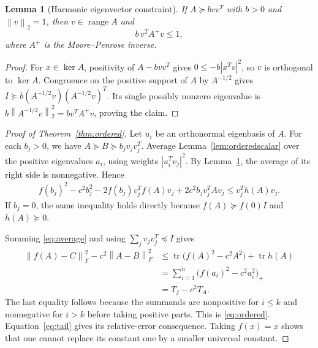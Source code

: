 \documentclass[11pt]{article}
\newtheorem{lemma}[theorem]{Lemma}
\theoremstyle{definition}
\newcommand{\tr}{\operatorname{tr}}
\newcommand{\range}{\operatorname{range}}
\newcommand{\norm}[1]{\left\lVert#1\right\rVert}
\newcommand{\TA}{T_A}
\newcommand{\Tf}{T_f}
\begin{document}
\begin{lemma}[Harmonic eigenvector constraint]\label{lem:harmonic}
If $A\succeq bvv^T$ with $b>0$ and $\norm v_2=1$, then $v\in\range A$ and
\[
 b\,v^TA^+v\le1,
\]
where $A^+$ is the Moore--Penrose inverse.
\end{lemma}
\begin{proof}
For $x\in\ker A$, positivity of $A-bvv^T$ gives $0\le-b|x^Tv|^2$, so $v$ is orthogonal to $\ker A$. Congruence on the positive support of $A$ by $A^{-1/2}$ gives $I\succeq b(A^{-1/2}v)(A^{-1/2}v)^T$. Its single possibly nonzero eigenvalue is $b\norm{A^{-1/2}v}_2^2=bv^TA^+v$, proving the claim.
\end{proof}

\begin{proof}[Proof of Theorem~\ref{thm:ordered}]
Let $u_i$ be an orthonormal eigenbasis of $A$. For each $b_j>0$, we have $A\succeq B\succeq b_jv_jv_j^T$. Average Lemma~\ref{lem:orderedscalar} over the positive eigenvalues $a_i$, using weights $|u_i^Tv_j|^2$. By Lemma~\ref{lem:harmonic}, the average of its right side is nonnegative. Hence
\begin{align}\label{eq:average}
 f(b_j)^2-c^2b_j^2-2f(b_j)v_j^Tf(A)v_j
       +2c^2b_jv_j^TAv_j
 \le v_j^Th(A)v_j.
\end{align}
If $b_j=0$, the same inequality holds directly because $f(A)\succeq f(0)I$ and $h(A)\succeq0$.

Summing \eqref{eq:average} and using $\sum_jv_jv_j^T\preceq I$ gives
\begin{align*}
 \norm{f(A)-C}_F^2-c^2\norm{A-B}_F^2
 &\le\tr\bigl(f(A)^2-c^2A^2\bigr)+\tr h(A)\\
 &=\sum_{i=1}^n\bigl(f(a_i)^2-c^2a_i^2\bigr)_+\\
 &=\Tf-c^2\TA.
\end{align*}
The last equality follows because the summands are nonpositive for $i\le k$ and nonnegative for $i>k$ before taking positive parts. This is \eqref{eq:ordered}. Equation~\eqref{eq:tail} gives its relative-error consequence. Taking $f(x)=x$ shows that one cannot replace its constant one by a smaller universal constant.
\end{proof}
\end{document}
